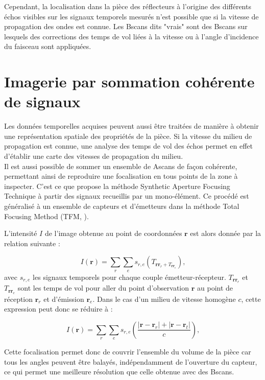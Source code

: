 Cependant, la localisation dans la pièce des réflecteurs à l'origine des différents échos visibles sur les signaux temporels mesurés n'est possible que si la vitesse de propagation des ondes est connue. Les Bscans dits "vrais" sont des Bscans sur lesquels des corrections des temps de vol liées à la vitesse ou à l'angle d'incidence du faisceau sont appliquées.


\section{Imagerie par sommation cohérente de signaux}
Les données temporelles acquises peuvent aussi être traitées de manière à obtenir une représentation spatiale des propriétés de la pièce. Si la vitesse du milieu de propagation est connue, une analyse des temps de vol des échos permet en effet d'établir une carte des vitesses de propagation du milieu. \\

Il est aussi possible de sommer un ensemble de Ascans de façon cohérente, permettant ainsi de reproduire une focalisation en tous points de la zone à inspecter. C'est ce que propose la méthode Synthetic Aperture Focusing Technique \citep{doctor_saft} à partir des signaux recueillis par un mono-élément. Ce procédé est généralisé à un ensemble de capteurs et d'émetteurs dans la méthode Total Focusing Method (TFM, \cite{holmes_tfm}). 

L'intensité $I$ de l'image obtenue au point de coordonnées $\bm{r}$ est alors donnée par la relation suivante : 

\begin{equation}
	I(\bm{r})= \displaystyle\sum_{r} \displaystyle\sum_{e} s_{r,e}\left( T_{\bm{r}\bm{r}_{r}+T_{\bm{r}\bm{r}_{e}}} \right) \text{,}	
\end{equation}
avec $s_{r,e}$ les signaux temporels pour chaque couple émetteur-récepteur. $T_{\bm{r}\bm{r}_{r}}$ et $T_{\bm{r}\bm{r}_{e}}$ sont les temps de vol pour aller du point d'observation $\bm{r}$ au point de réception $\bm{r}_{r} $ et d'émission $\bm{r}_{e}$. Dans le cas d'un milieu de vitesse homogène $c$, cette expression peut donc se réduire à :

\begin{equation}
	I(\bm{r})= \displaystyle\sum_{r} \displaystyle\sum_{e} s_{r,e}\left( \frac{|\bm{r} - \bm{r}_r| + |\bm{r} - \bm{r}_t|}{c}\right) \text{,}
\end{equation}

Cette focalisation permet donc de couvrir l'ensemble du volume de la pièce car tous les angles peuvent être balayés, indépendamment de l'ouverture du capteur, ce qui permet une meilleure résolution que celle obtenue avec des Bscans.\\






